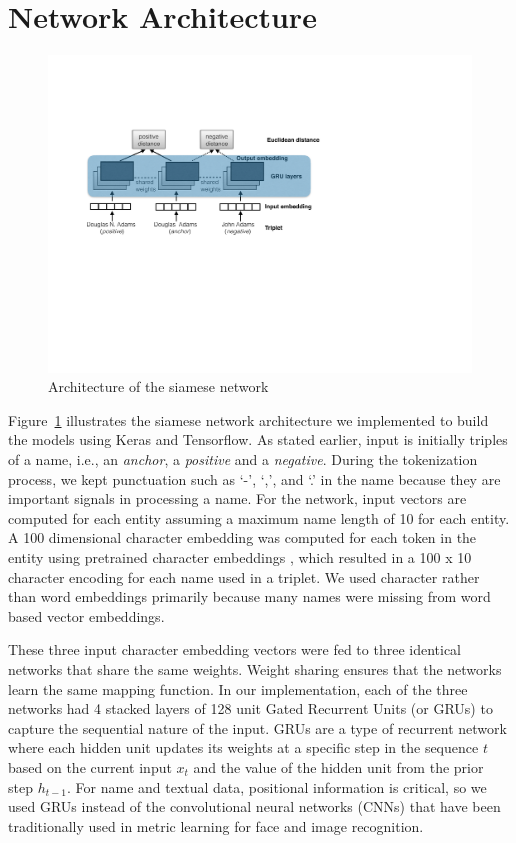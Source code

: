 \section{Network Architecture}
\label{architecture}
\begin{figure}
\begin{center}
\includegraphics[width=0.8\linewidth]{triplet_siamese_network}
\end{center}
\caption{Architecture of the siamese network}
\label{siamese_nets}
\end{figure}

Figure~\ref{siamese_nets} illustrates the siamese network architecture \cite{DBLP:conf/cvpr/SchroffKP15} we implemented to build the models using Keras and Tensorflow.  As stated earlier, input is initially triples of a name, i.e., an \textit{anchor}, a \textit{positive} and a \textit{negative}.  During the tokenization process, we kept punctuation such as `-', `,', and `.' in the name because they are important signals in processing a name.  For the network, input vectors are computed for each entity assuming a maximum name length of 10 for each entity.  A 100 dimensional character embedding was computed for each token in the entity using pretrained character embeddings \cite{hashimoto-jmt:2017:EMNLP2017}, which resulted in a 100 x 10 character encoding for each name used in a triplet.  We used character rather than word embeddings primarily because many names were missing from word based vector embeddings.

These three input character embedding vectors were fed to three identical networks that share the same weights.  Weight sharing ensures that the networks learn the same mapping function.  In our implementation, each of the three networks had 4 stacked layers of 128 unit Gated Recurrent Units (or GRUs) to capture the sequential nature of the input.  GRUs are a type of recurrent network \cite{cho-al-emnlp14} where each hidden unit updates its weights at a specific step in the sequence $t$ based on the current input $x_t$ and the value of the hidden unit from the prior step $h_{t-1}$.  For name and textual data, positional information is critical, so we used GRUs instead of the convolutional neural networks (CNNs) that have been traditionally used in metric learning for face and image recognition. 


